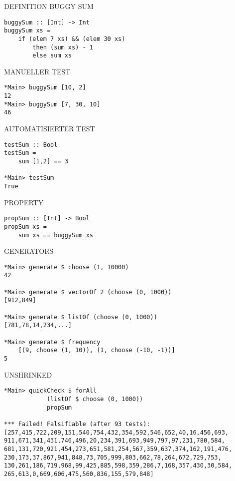\newpage

DEFINITION BUGGY SUM

\begin{verbatim}
buggySum :: [Int] -> Int
buggySum xs = 
    if (elem 7 xs) && (elem 30 xs)
        then (sum xs) - 1
        else sum xs
\end{verbatim}

MANUELLER TEST

\begin{verbatim}
*Main> buggySum [10, 2]
12
*Main> buggySum [7, 30, 10]
46
\end{verbatim}

AUTOMATISIERTER TEST

\begin{verbatim}
testSum :: Bool
testSum = 
    sum [1,2] == 3

*Main> testSum
True
\end{verbatim}

PROPERTY

\begin{verbatim}
propSum :: [Int] -> Bool
propSum xs = 
    sum xs == buggySum xs
\end{verbatim}

\newpage

GENERATORS

\begin{verbatim}
*Main> generate $ choose (1, 10000)
42

*Main> generate $ vectorOf 2 (choose (0, 1000))
[912,849]

*Main> generate $ listOf (choose (0, 1000))
[781,78,14,234,...]

*Main> generate $ frequency
    [(9, choose (1, 10)), (1, choose (-10, -1))]
5
\end{verbatim}

UNSHRINKED

\begin{verbatim}
*Main> quickCheck $ forAll 
            (listOf $ choose (0, 1000)) 
            propSum

*** Failed! Falsifiable (after 93 tests):  
[257,415,722,209,151,540,754,432,354,592,546,652,40,16,456,693,
911,671,341,431,746,496,20,234,391,693,949,797,97,231,780,584,
681,131,720,921,454,273,651,581,254,567,359,637,374,162,191,476,
230,173,37,867,941,848,73,705,999,803,662,78,264,672,729,753,
130,261,186,719,968,99,425,885,598,359,286,7,168,357,430,30,584,
265,613,0,669,606,475,560,836,155,579,848]
\end{verbatim}

